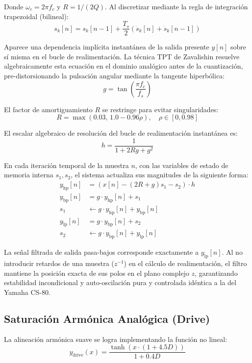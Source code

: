 \documentclass[11pt,a4paper]{article}
\begin{document}
Donde $\omega_c = 2\pi f_c$ y $R = 1 / (2Q)$. Al discretizar mediante la regla de integración trapezoidal (bilineal):
\begin{equation}
s_k[n] = s_k[n-1] + \frac{T_s}{2}\left(\dot{s}_k[n] + \dot{s}_k[n-1]\right)
\end{equation}

Aparece una dependencia implícita instantánea de la salida presente $y[n]$ sobre sí misma en el bucle de realimentación. La técnica TPT de Zavalishin resuelve algebraicamente esta ecuación en el dominio analógico antes de la cuantización, pre-distorsionando la pulsación angular mediante la tangente hiperbólica:
\begin{equation}
g = \tan\left(\frac{\pi f_c}{f_s}\right)
\end{equation}

El factor de amortiguamiento $R$ se restringe para evitar singularidades:
\begin{equation}
R = \max\left(0.03, \, 1.0 - 0.96 \rho\right), \quad \rho \in [0, 0.98]
\end{equation}

El escalar algebraico de resolución del bucle de realimentación instantánea es:
\begin{equation}
h = \frac{1}{1 + 2 R g + g^2}
\end{equation}

En cada iteración temporal de la muestra $n$, con las variables de estado de memoria interna $s_1, s_2$, el sistema actualiza sus magnitudes de la siguiente forma:
\begin{align}
y_{\text{hp}}[n] &= \left(x[n] - (2R + g)s_1 - s_2\right) \cdot h \\
y_{\text{bp}}[n] &= g \cdot y_{\text{hp}}[n] + s_1 \\
s_1 &\leftarrow g \cdot y_{\text{hp}}[n] + y_{\text{bp}}[n] \\
y_{\text{lp}}[n] &= g \cdot y_{\text{bp}}[n] + s_2 \\
s_2 &\leftarrow g \cdot y_{\text{bp}}[n] + y_{\text{lp}}[n]
\end{align}

La señal filtrada de salida pasa-bajos corresponde exactamente a $y_{\text{lp}}[n]$. Al no introducir retardos de una muestra ($z^{-1}$) en el cálculo de realimentación, el filtro mantiene la posición exacta de sus polos en el plano complejo $z$, garantizando estabilidad incondicional y auto-oscilación pura y controlada idéntica a la del Yamaha CS-80.

\subsection{Saturación Armónica Analógica (Drive)}
La alineación armónica suave se logra implementando la función no lineal:
\begin{equation}
y_{\text{drive}}(x) = \frac{\tanh\left(x \cdot (1 + 4.5 D)\right)}{1 + 0.4 D}
\end{equation}
\end{document}
